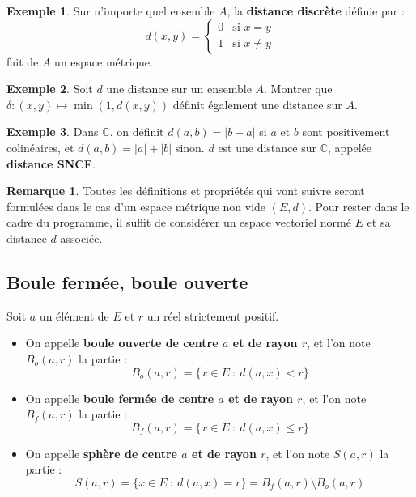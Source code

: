 \documentclass[french]{article}
\newcommand{\C}{\mathbb{C}}
\theoremstyle{plain}
\theoremstyle{definition}
\newtheorem*{ex}{Exemple}
\newtheorem*{rmq}{Remarque}
\theoremstyle{remark}
\begin{document}
\begin{ex}
	Sur n'importe quel ensemble $A$, la \textbf{distance discrète} définie par : $$d(x,y)=\begin{cases}
		0&\text{si }x=y\\
		1&\text{si }x\ne y 
	\end{cases}$$ fait de $A$ un espace métrique.
\end{ex}

\begin{ex}
	Soit $d$ une distance sur un ensemble $A$. Montrer que $\delta:(x,y)\mapsto\min(1,d(x,y))$ définit également une distance sur $A$.
\end{ex}

\begin{ex}
	Dans $\C$, on définit $d(a,b)=\lvert b-a\rvert$ si $a$ et $b$ sont positivement colinéaires, et $d(a,b)=\lvert a\rvert+\lvert b\rvert$ sinon. $d$ est une distance sur $\C$, appelée \textbf{distance SNCF}.
\end{ex}

\begin{rmq}%
	Toutes les définitions et propriétés qui vont suivre seront formulées dans le cas d'un espace métrique non vide $(E,d)$. Pour rester dans le cadre du programme, il suffit de considérer un espace vectoriel normé $E$ et sa distance $d$ associée.
\end{rmq}

\subsection{Boule fermée, boule ouverte}

\begin{dfn}
	Soit $a$ un élément de $E$ et $r$ un réel strictement positif.
	\begin{itemize}
		\item On appelle \textbf{boule ouverte de centre $a$ et de rayon $r$}, et l'on note $B_o(a,r)$ la partie : $$B_o(a,r)=\{x\in E\ : \ d(a,x)<r\}$$
		\item On appelle \textbf{boule fermée de centre $a$ et de rayon $r$}, et l'on note $B_f(a,r)$ la partie : $$B_f(a,r)=\{x\in E\ : \ d(a,x)\leqslant r\}$$
		\item On appelle \textbf{sphère de centre $a$ et de rayon $r$}, et l'on note $S(a,r)$ la partie : $$S(a,r)=\{x\in E\ : \ d(a,x)=r\}=B_f(a,r)\setminus B_o(a,r)$$
	\end{itemize}
\end{dfn}
\end{document}
